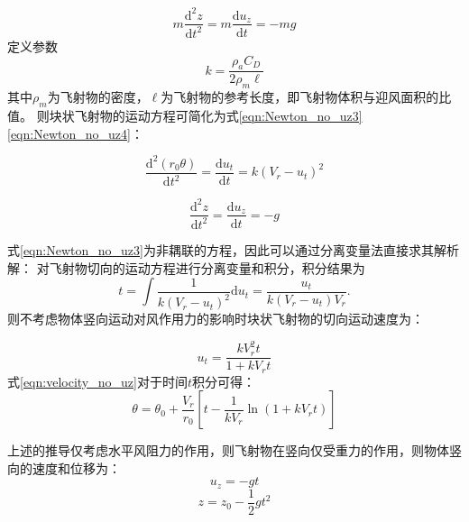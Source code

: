 \documentclass{ctexart}
\begin{document}
\begin{equation}
  \label{eqn:Newton_no_uz2}
  m\frac{\mathrm{d}^2 z}{\mathrm{d} t^2} = m\frac{\mathrm{d} u_z}{\mathrm{d} t } = -mg
\end{equation}
定义参数
\begin{equation}
k=\frac{\rho_a C_D}{2 \rho_m \ell}
\end{equation}
其中$\rho_m$为飞射物的密度，$\ell$为飞射物的参考长度，即飞射物体积与迎风面积的比值。
则块状飞射物的运动方程可简化为式\eqref{eqn:Newton_no_uz3}\eqref{eqn:Newton_no_uz4}：

\begin{equation}
  \label{eqn:Newton_no_uz3}
      \frac{\mathrm{d}^2 \left(r_0 \theta\right)}{\mathrm{d} t^2} = \frac{\mathrm{d} u_t}{\mathrm{d} t} = k \left(V_r-u_t\right)^2
\end{equation}

\begin{equation}
\label{eqn:Newton_no_uz4}
\frac{\mathrm{d}^2 z}{\mathrm{d} t^2} = \frac{\mathrm{d} u_z}{\mathrm{d} t } = -g
\end{equation}
 

式\eqref{eqn:Newton_no_uz3}为非耦联的方程，因此可以通过分离变量法直接求其解析解：
对飞射物切向的运动方程进行分离变量和积分，积分结果为
\begin{equation}
t=\int \frac{1}{k \left(V_r-u_t\right)^2} \mathrm{d} u_t =\frac{u_t}{k\left(V_r-u_t\right) V_r}.
\end{equation}
则不考虑物体竖向运动对风作用力的影响时块状飞射物的切向运动速度为：

\begin{equation}
  \label{eqn:velocity_no_uz}
    u_t=\frac{kV_r^2 t}{1+k V_r t}
\end{equation}
式\eqref{eqn:velocity_no_uz}对于时间$t$积分可得：
\begin{equation}
  \label{eqn:displacement_no_uz}
    \theta=\theta_0+\frac{V_r}{r_0} \left[t-\frac{1}{k V_r} \ln \left(1+kV_r t\right)\right]
\end{equation}

上述的推导仅考虑水平风阻力的作用，则飞射物在竖向仅受重力的作用，则物体竖向的速度和位移为：
\begin{equation}
u_z=-gt
\end{equation}
\begin{equation}
z=z_0-\frac{1}{2}gt^2
\end{equation}
\end{document}
